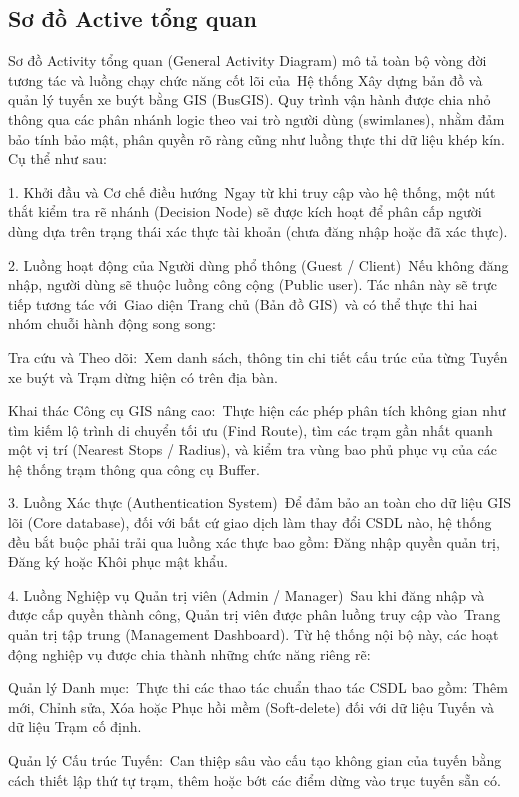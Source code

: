 \documentclass[13pt,a4paper]{report}
\begin{document}
\subsection{Sơ đồ Active tổng quan}

Sơ đồ Activity tổng quan (General Activity Diagram) mô tả toàn bộ vòng đời tương tác và luồng chạy chức năng cốt lõi của Hệ thống Xây dựng bản đồ và quản lý tuyến xe buýt bằng GIS (BusGIS). Quy trình vận hành được chia nhỏ thông qua các phân nhánh logic theo vai trò người dùng (swimlanes), nhằm đảm bảo tính bảo mật, phân quyền rõ ràng cũng như luồng thực thi dữ liệu khép kín. Cụ thể như sau:

1. Khởi đầu và Cơ chế điều hướng Ngay từ khi truy cập vào hệ thống, một nút thắt kiểm tra rẽ nhánh (Decision Node) sẽ được kích hoạt để phân cấp người dùng dựa trên trạng thái xác thực tài khoản (chưa đăng nhập hoặc đã xác thực).

2. Luồng hoạt động của Người dùng phổ thông (Guest / Client) Nếu không đăng nhập, người dùng sẽ thuộc luồng công cộng (Public user). Tác nhân này sẽ trực tiếp tương tác với Giao diện Trang chủ (Bản đồ GIS) và có thể thực thi hai nhóm chuỗi hành động song song:

Tra cứu và Theo dõi: Xem danh sách, thông tin chi tiết cấu trúc của từng Tuyến xe buýt và Trạm dừng hiện có trên địa bàn.

Khai thác Công cụ GIS nâng cao: Thực hiện các phép phân tích không gian như tìm kiếm lộ trình di chuyển tối ưu (Find Route), tìm các trạm gần nhất quanh một vị trí (Nearest Stops / Radius), và kiểm tra vùng bao phủ phục vụ của các hệ thống trạm thông qua công cụ Buffer.

3. Luồng Xác thực (Authentication System) Để đảm bảo an toàn cho dữ liệu GIS lõi (Core database), đối với bất cứ giao dịch làm thay đổi CSDL nào, hệ thống đều bắt buộc phải trải qua luồng xác thực bao gồm: Đăng nhập quyền quản trị, Đăng ký hoặc Khôi phục mật khẩu.

4. Luồng Nghiệp vụ Quản trị viên (Admin / Manager) Sau khi đăng nhập và được cấp quyền thành công, Quản trị viên được phân luồng truy cập vào Trang quản trị tập trung (Management Dashboard). Từ hệ thống nội bộ này, các hoạt động nghiệp vụ được chia thành những chức năng riêng rẽ:

Quản lý Danh mục: Thực thi các thao tác chuẩn thao tác CSDL bao gồm: Thêm mới, Chỉnh sửa, Xóa hoặc Phục hồi mềm (Soft-delete) đối với dữ liệu Tuyến và dữ liệu Trạm cố định.

Quản lý Cấu trúc Tuyến: Can thiệp sâu vào cấu tạo không gian của tuyến bằng cách thiết lập thứ tự trạm, thêm hoặc bớt các điểm dừng vào trục tuyến sẵn có.
\end{document}
